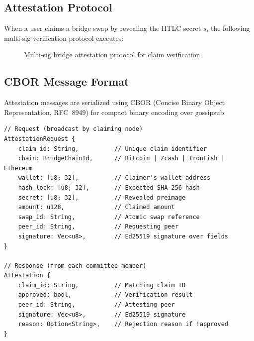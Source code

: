 \documentclass[11pt,a4paper]{article}
\begin{document}
\subsection{Attestation Protocol}

When a user claims a bridge swap by revealing the HTLC secret $s$, the following multi-sig verification protocol executes:

\begin{figure}[H]
\centering
{}
\caption{Multi-sig bridge attestation protocol for claim verification.}
\label{fig:attestation-protocol}
\end{figure}

\subsection{CBOR Message Format}

Attestation messages are serialized using CBOR (Concise Binary Object Representation, RFC~8949) for compact binary encoding over gossipsub:

\begin{lstlisting}[language={},title={Attestation Message Types (CBOR)}]
// Request (broadcast by claiming node)
AttestationRequest {
    claim_id: String,          // Unique claim identifier
    chain: BridgeChainId,      // Bitcoin | Zcash | IronFish | Ethereum
    wallet: [u8; 32],          // Claimer's wallet address
    hash_lock: [u8; 32],       // Expected SHA-256 hash
    secret: [u8; 32],          // Revealed preimage
    amount: u128,              // Claimed amount
    swap_id: String,           // Atomic swap reference
    peer_id: String,           // Requesting peer
    signature: Vec<u8>,        // Ed25519 signature over fields
}

// Response (from each committee member)
Attestation {
    claim_id: String,          // Matching claim ID
    approved: bool,            // Verification result
    peer_id: String,           // Attesting peer
    signature: Vec<u8>,        // Ed25519 signature
    reason: Option<String>,    // Rejection reason if !approved
}
\end{lstlisting}
\end{document}
